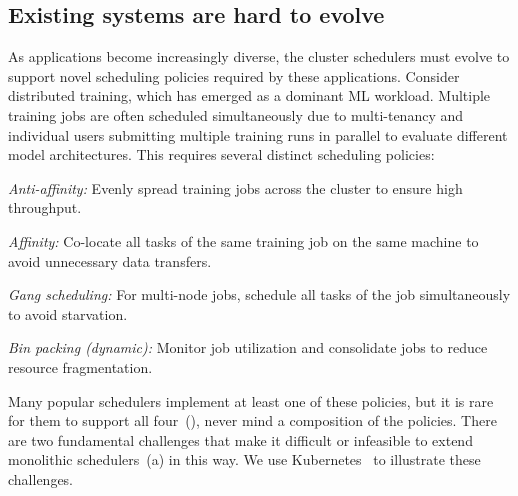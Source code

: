 

\subsection{Existing systems are hard to evolve}
\label{sec:motivation:example}

As applications become increasingly diverse, the cluster schedulers must evolve to support novel scheduling policies required by these applications. Consider distributed training, which has emerged as a dominant ML workload. 
Multiple training jobs are often scheduled simultaneously due to multi-tenancy and individual users submitting multiple training runs in parallel to evaluate different model architectures.
This requires several distinct scheduling policies: %
\begin{compactitem}
\item \emph{Anti-affinity:} Evenly spread training jobs across the cluster to ensure high throughput.
\item \emph{Affinity:} Co-locate all tasks of the same training job on the same machine to avoid unnecessary data transfers.
\item \emph{Gang scheduling:} For multi-node jobs, schedule all tasks of the job simultaneously to avoid starvation.
\item \emph{Bin packing (dynamic):} Monitor job utilization and consolidate jobs to reduce resource fragmentation. %
\end{compactitem}

Many popular schedulers implement at least one of these policies, but it is rare for them to support all four~(), never mind a composition of the policies.
There are two fundamental challenges that make it difficult or infeasible to extend monolithic schedulers~(a) in this way.
We use Kubernetes~\cite{kubernetes} to illustrate these challenges. %
% 

